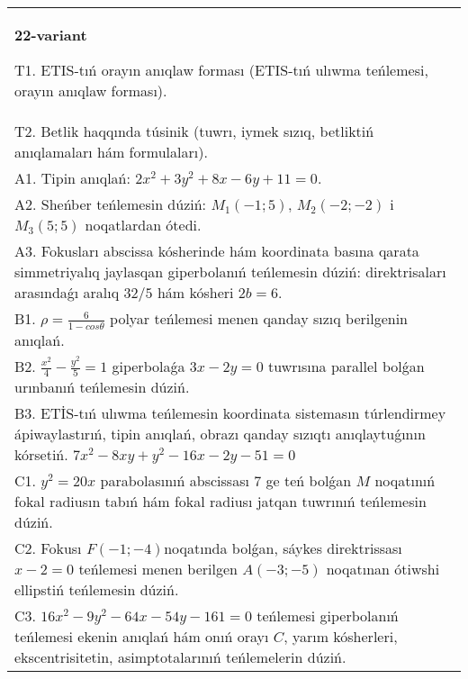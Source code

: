 \documentclass{article}
\begin{document}
\begin{tabular}{m{17cm}}
\textbf{22-variant}
\newline

T1. ETIS-tıń orayın anıqlaw forması (ETIS-tıń ulıwma teńlemesi, orayın anıqlaw forması).\\

T2. Betlik haqqında túsinik (tuwrı, iymek sızıq, betliktiń anıqlamaları hám formulaları).\\

A1. Tipin anıqlań: $2 x^{2}+3 y^{2}+8 x-6 y+11=0$.\\

A2. Sheńber teńlemesin dúziń: $M_1 (-1;5) $, $M_2 (-2;-2) $ i $M_3 (5;5) $ noqatlardan ótedi.\\

A3. Fokusları abscissa kósherinde hám koordinata basına qarata simmetriyalıq jaylasqan giperbolanıń teńlemesin dúziń: direktrisaları arasındaǵı aralıq $32/5$ hám kósheri $2 b=6$.\\

B1. $\rho = \frac{6}{1 - cos\theta}$ polyar teńlemesi menen qanday sızıq berilgenin anıqlań.  \\

B2. $\frac{x^{2}}{4} - \frac{y^{2}}{5} = 1$ giperbolaǵa $3x - 2y = 0$ tuwrısına parallel bolǵan urınbanıń teńlemesin dúziń.  \\

B3. ETİS-tıń ulıwma teńlemesin koordinata sistemasın túrlendirmey ápiwaylastırıń, tipin anıqlań, obrazı qanday sızıqtı anıqlaytuǵının kórsetiń. $7x^{2} - 8xy + y^{2} - 16x - 2y - 51 = 0$  \\

C1. $y^{2} = 20x$ parabolasınıń abscissası 7 ge teń bolǵan $M$ noqatınıń fokal radiusın tabıń hám fokal radiusı jatqan tuwrınıń teńlemesin dúziń.  \\

C2. Fokusı $F( - 1; - 4)$noqatında bolǵan, sáykes direktrissası $x - 2 = 0$ teńlemesi menen berilgen $A( - 3; - 5)$ noqatınan ótiwshi ellipstiń teńlemesin dúziń.  \\

C3. $16x^{2} - 9y^{2} - 64x - 54y - 161 = 0$ teńlemesi giperbolanıń teńlemesi ekenin anıqlań hám onıń orayı $C$, yarım kósherleri, ekscentrisitetin, asimptotalarınıń teńlemelerin dúziń.  \\

\end{tabular}
\vspace{1cm}
\end{document}
